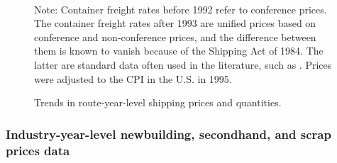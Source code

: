\documentclass[11pt]{article}
\begin{document}
\begin{figure}[!ht]
\begin{center}
  \\
  \caption{Trends in route-year-level shipping prices and quantities.}
  \label{fg:container_freight_rate_and_shipping_quantity_each_route}
  \end{center}
\footnotesize
  Note: Container freight rates before 1992 refer to conference prices. The container freight rates after 1993 are unified prices based on conference and non-conference  prices, and the difference between them is known to vanish because of the Shipping Act of 1984. The latter are standard data often used in the literature, such as \cite{jeon2022learning}. Prices were adjusted to the CPI in the U.S. in 1995.
\end{figure}


\subsubsection{Industry-year-level newbuilding, secondhand, and scrap prices data}
\end{document}
